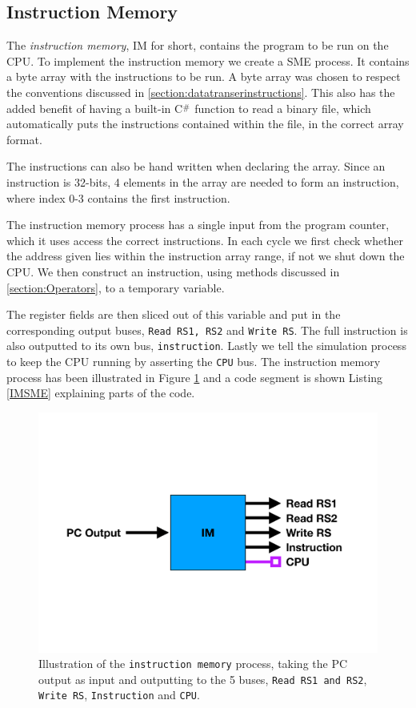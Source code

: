     \subsection{Instruction Memory}
        The \textit{instruction memory}, IM for short, contains the program to be run on the CPU. To implement the instruction memory we create a SME process. It contains a byte array with the instructions to be run. A byte array was chosen to respect the conventions discussed in \ref{section:datatranserinstructions}. This also has the added benefit of having a built-in C$\scalerel*{\#}{X}$ function to read a binary file, which automatically puts the instructions contained within the file, in the correct array format. 
        
        The instructions can also be hand written when declaring the array. Since an instruction is 32-bits, 4 elements in the array are needed to form an instruction, where index 0-3 contains the first instruction.
        
        The instruction memory process has a single input from the program counter, which it uses access the correct instructions. In each cycle we first check whether the address given lies within the instruction array range, if not we shut down the CPU.
        We then construct an instruction, using methods discussed in \ref{section:Operators}, to a temporary variable.
        
        The register fields are then sliced out of this variable and put in the corresponding output buses, \texttt{Read RS1, RS2} and \texttt{Write RS}. The full instruction is also outputted to its own bus, \texttt{instruction}. Lastly we tell the simulation process to keep the CPU running by asserting the \texttt{CPU} bus. The instruction memory process has been illustrated in Figure \ref{fig:IM} and a code segment is shown Listing \ref{IMSME} explaining parts of the code. 
     
        \begin{figure}[h!]
            \centering
            \includegraphics[scale=0.3]{pictures/IM.pdf}
            \caption{Illustration of the \texttt{instruction memory} process, taking the PC output as input and outputting to the 5 buses, \texttt{Read RS1 and RS2}, \texttt{Write RS}, \texttt{Instruction} and \texttt{CPU}.}
            \label{fig:IM}
        \end{figure}
    
